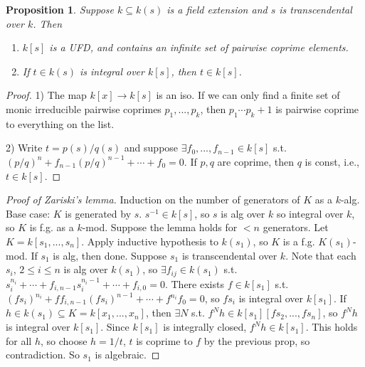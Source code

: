 \documentclass{article}
\theoremstyle{definition}
\theoremstyle{remark}
\theoremstyle{plain}
\newtheorem{prop}[defn]{Proposition}
\begin{document}
\begin{prop}
    Suppose $k\subseteq k(s)$ is a field extension and $s$ is transcendental over $k$. Then
    \begin{enumerate}[1)]
        \item $k[s]$ is a UFD, and contains an infinite set of pairwise coprime elements.
        \item If $t\in k(s)$ is integral over $k[s]$, then $t\in k[s]$.
    \end{enumerate}
\end{prop}
\begin{proof}
    1) The map $k[x]\to k[s]$ is an iso. If we can only find a finite set of monic irreducible pairwise coprimes $p_1,...,p_k$, then $p_1\cdots p_k+1$ is pairwise coprime to everything on the list.

    2) Write $t=p(s)/q(s)$ and suppose $\exists f_0,...,f_{n-1}\in k[s]$ s.t. $(p/q)^n+f_{n-1}(p/q)^{n-1}+\cdots+f_0=0$. If $p,q$ are coprime, then $q$ is const, i.e., $t\in k[s]$.
\end{proof}
\begin{proof}[Proof of Zariski's lemma]
    Induction on the number of generators of $K$ as a $k$-alg.
    Base case: $K$ is generated by $s$. $s^{-1}\in k[s]$, so $s$ is alg over $k$ so integral over $k$, so $K$ is f.g. as a $k$-mod. Suppose the lemma holds for $<n$ generators. Let $K=k[s_1,...,s_n]$. Apply inductive hypothesis to $k(s_1)$, so $K$ is a f.g. $K(s_1)$-mod. If $s_1$ is alg, then done. Suppose $s_1$ is transcendental over $k$. Note that each $s_i$, $2\le i\le n$ is alg over $k(s_1)$, so $\exists f_{ij}\in k(s_1)$ s.t. $s_i^{n_i}+\cdots+f_{i,n-1}s_i^{n_{i}-1}+\cdots+f_{i,0}=0$. There exists $f\in k[s_1]$ s.t. $(fs_i)^{n_i}+ff_{i,n-1}(fs_i)^{n-1}+\cdots+f^{n_i}f_0=0$, so $fs_i$ is integral over $k[s_1]$. If $h\in k(s_1)\subseteq K=k[x_1,...,x_n]$, then $\exists N$ s.t. $f^Nh\in k[s_1][fs_2,...,fs_n]$, so $f^Nh$ is integral over $k[s_1]$. Since $k[s_1]$ is integrally closed, $f^Nh\in k[s_1]$. This holds for all $h$, so choose $h=1/t$, $t$ is coprime to $f$ by the previous prop, so contradiction. So $s_1$ is algebraic.
\end{proof}
\end{document}
